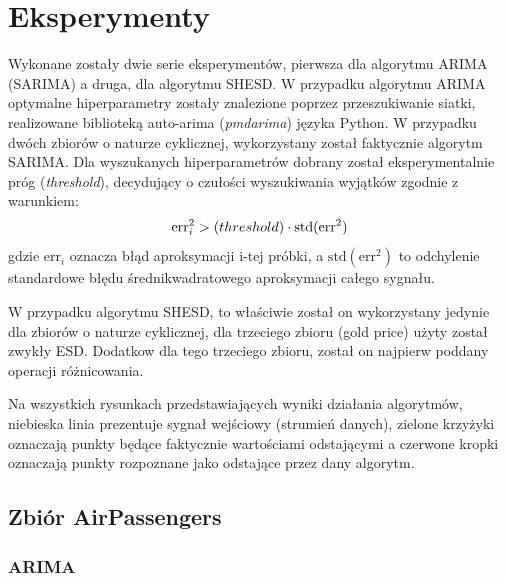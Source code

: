 \documentclass{classrep}
\begin{document}
    \section{Eksperymenty} {

        Wykonane zostały dwie serie eksperymentów, pierwsza dla algorytmu ARIMA (SARIMA) a druga,
        dla algorytmu SHESD. W przypadku algorytmu ARIMA optymalne hiperparametry zostały znalezione
        poprzez przeszukiwanie siatki, realizowane biblioteką auto-arima (\textit{pmdarima}) języka
        Python. W przypadku dwóch zbiorów o naturze cyklicznej, wykorzystany został faktycznie
        algorytm SARIMA. Dla wyszukanych hiperparametrów dobrany został eksperymentalnie próg
        (\textit{threshold}), decydujący o czułości wyszukiwania wyjątków zgodnie z warunkiem:
        \begin{equation}
            \textrm{err}^{2}_{i} > \textrm(threshold) \cdot \textrm{std}(\textrm{err}^{2})
        \end{equation}
        gdzie $\textrm{err}_{i}$ oznacza błąd aproksymacji i-tej próbki, a
        $\textrm{std}(\textrm{err}^{2})$ to odchylenie standardowe błędu średnikwadratowego
        aproksymacji całego sygnału.

        W przypadku algorytmu SHESD, to właściwie został on wykorzystany jedynie dla zbiorów o
        naturze cyklicznej, dla trzeciego zbioru (gold price) użyty został zwykły ESD. Dodatkow dla
        tego trzeciego zbioru, został on najpierw poddany operacji różnicowania.

        Na wszystkich rysunkach przedstawiających wyniki działania algorytmów, niebieska linia
        prezentuje sygnał wejściowy (strumień danych), zielone krzyżyki oznaczają punkty będące
        faktycznie wartościami odstającymi a czerwone kropki oznaczają punkty rozpoznane jako
        odstające przez dany algorytm.

        \subsection{Zbiór AirPassengers} {

            \subsubsection{ARIMA} {

}}}
\end{document}
